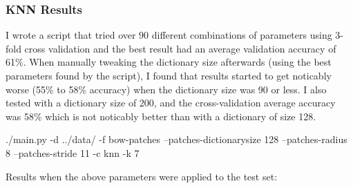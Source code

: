 \documentclass[fleqn]{article}
\begin{document}
\subsubsection{KNN Results}
I wrote a script that tried over 90 different combinations of parameters using 3-fold cross validation and the best result had an average validation accuracy of 61\%.  When manually tweaking the dictionary size afterwards (using the best parameters found by the script), I found that results started to get noticably worse (55\% to 58\% accuracy) when the dictionary size was 90 or less.  I also tested with a dictionary size of 200, and the cross-validation average accuracy was 58\% which is not noticably better than with a dictionary of size 128.
\begin{solution}
    ./main.py -d ../data/ -f bow-patches --patches-dictionarysize 128 --patches-radius 8 --patches-stride 11  -c knn -k 7
\end{solution}
Results when the above parameters were applied to the test set:
\end{document}
